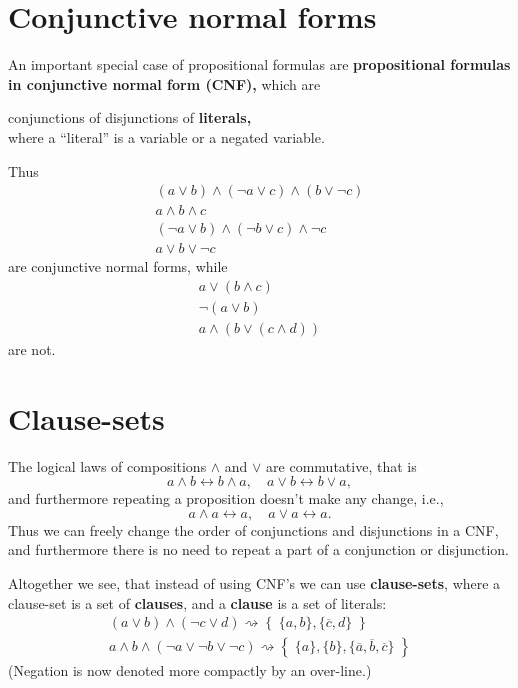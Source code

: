 \documentclass{article}
\begin{document}
\section{Conjunctive normal forms}%

An important special case of propositional formulas are \textbf{propositional formulas in conjunctive normal form (CNF),} which are

conjunctions of disjunctions of \textbf{literals,}\\ where a ``literal'' is a variable or a negated variable.

Thus
\begin{eqnarray*}
&(a\vee b) \wedge (\neg a \vee c) \wedge (b\vee \neg c)& \\
&a\wedge b \wedge c& \\
&(\neg a \vee b) \wedge (\neg b \vee c) \wedge \neg c& \\
&a \vee b \vee \neg c&
\end{eqnarray*}
are conjunctive normal forms, while
\begin{eqnarray*}
&a\vee (b \wedge c)&\\
&\neg(a\vee b)& \\
&a \wedge (b\vee (c\wedge d))&
\end{eqnarray*}
are not. 


\section{Clause-sets}%

The logical laws of compositions $\wedge$ and $\vee$ are commutative, that is
\[
a\wedge b \leftrightarrow b\wedge a, \quad  a\vee b \leftrightarrow b\vee a,
\]
and furthermore repeating a proposition doesn't make any change, i.e.,
\[
a\wedge a \leftrightarrow a, \quad  a\vee a \leftrightarrow a.
\]
Thus we can freely change the order of conjunctions and disjunctions in a CNF, and furthermore there is no need to repeat a part of a conjunction or disjunction.

Altogether we see, that instead of using CNF's we can use \textbf{clause-sets}, where a clause-set is a set of \textbf{clauses}, and a  \textbf{clause} is a set of literals:
\begin{eqnarray*}
&(a\vee b) \wedge (\neg c\vee d) \rightsquigarrow \left\{ \; \{a,b\}, \{\overline{c}, d\} \; \right\}& \\
& a\wedge b\wedge (\neg a \vee \neg b \vee \neg c) \rightsquigarrow \left\{ \; \{a\},\{b\}, \{\overline{a}, \overline{b}, \overline{c}\} \; \right\}&
\end{eqnarray*}
(Negation is now denoted more compactly by an over-line.)
\end{document}
